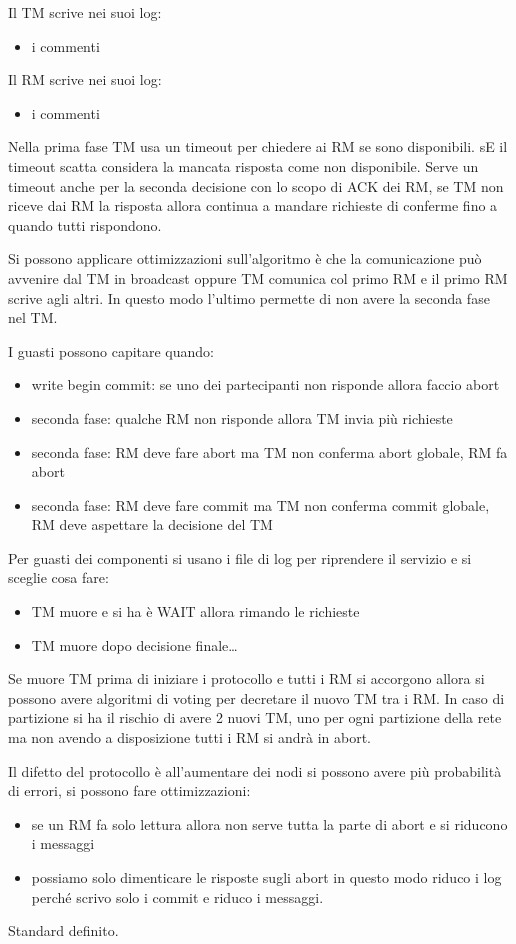 Il TM scrive nei suoi log:
\begin{itemize}
      \item i commenti 
\end{itemize}
Il RM scrive nei suoi log:
\begin{itemize}
      \item i commenti 
\end{itemize}

Nella prima fase TM usa un timeout per chiedere ai RM se sono disponibili. sE il
timeout scatta considera la mancata risposta come non disponibile. Serve un timeout
anche per la seconda decisione con lo scopo di ACK dei RM, se TM non riceve dai RM
la risposta allora continua a mandare richieste di conferme fino a quando tutti 
rispondono. 

Si possono applicare ottimizzazioni sull'algoritmo è che la comunicazione può
avvenire dal TM in broadcast oppure TM comunica col primo RM e il primo RM 
scrive agli altri. In questo modo l'ultimo permette di non avere la seconda fase 
nel TM.

I guasti possono capitare quando:
\begin{itemize}
      \item write begin commit: se uno dei partecipanti non risponde allora faccio
      abort
      \item seconda fase: qualche RM non risponde allora TM invia più richieste
      \item seconda fase: RM deve fare abort ma TM non conferma abort globale, RM
      fa abort
      \item seconda fase: RM deve fare commit ma TM non conferma commit globale, RM
      deve aspettare la decisione del TM
\end{itemize}
Per guasti dei componenti si usano i file di log per riprendere il servizio e si 
sceglie cosa fare:
\begin{itemize}
      \item TM muore e si ha è WAIT allora rimando le richieste
      \item TM muore dopo decisione finale\dots
\end{itemize}

Se muore TM prima di iniziare i protocollo e tutti i RM si accorgono allora si 
possono avere algoritmi di voting per decretare il nuovo TM tra i RM. In caso di 
partizione si ha il rischio di avere 2 nuovi TM, uno per ogni partizione della 
rete ma non avendo a disposizione tutti i RM si andrà in abort.

Il difetto del protocollo è all'aumentare dei nodi si possono avere più probabilità
di errori, si possono fare ottimizzazioni:
\begin{itemize}
      \item se un RM fa solo lettura allora non serve tutta la parte di abort e si riducono i messaggi
      \item possiamo solo dimenticare le risposte sugli abort in questo modo riduco 
      i log perché scrivo solo i commit e riduco i messaggi. 
\end{itemize}

Standard definito.
